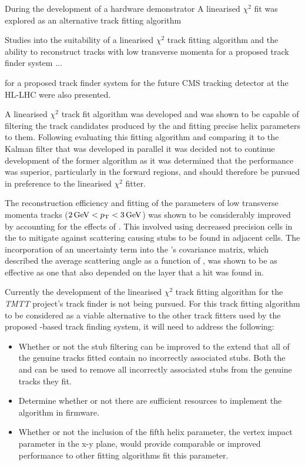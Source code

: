 During the development of a hardware demonstrator 
A linearised $\chi^{2}$ fit was explored as an alternative track fitting algorithm

Studies into the suitability of a linearised $\chi^{2}$ track fitting algorithm and the ability to reconstruct tracks with low transverse momenta for a proposed track finder system ...

 for a proposed track finder system for the future CMS tracking detector at the HL-LHC were also presented.

A linearised $\chi^{2}$ track fit algorithm was developed and was shown to be capable of filtering the track candidates produced by the \HT and fitting precise helix parameters to them.
Following evaluating this fitting algorithm and comparing it to the Kalman filter that was developed in parallel it was decided not to continue development of the former algorithm as it was determined that the \KF performance was superior, particularly in the forward regions, and should therefore be pursued in preference to the linearised $\chi^{2}$ fitter.

The reconstruction efficiency and fitting of the parameters of low transverse momenta tracks ($2\,\text{Ge\hspace{-.08em}V} < p_{\mathrm{T}} < 3\,\text{Ge\hspace{-.08em}V}$) was shown to be considerably improved by accounting for the effects of \MS.
This involved using decreased precision cells in the \HT to mitigate against scattering causing stubs to be found in adjacent \HT cells.
The incorporation of an uncertainty term into the \KF's covariance matrix, which described the average scattering angle as a function of \pT, was shown to be as effective as one that also depended on the layer that a hit was found in.

Currently the development of the linearised $\chi^{2}$ track fitting algorithm for the \emph{TMTT} project's track finder is not being pursued.
For this track fitting algorithm to be considered as a viable alternative to the other track fitters used by the proposed \HT-based track finding system, it will need to address the following:

\begin{itemize}
\item Whether or not the stub filtering can be improved to the extend that all of the genuine tracks fitted contain no incorrectly associated stubs. Both the \KF and \LR can be used to remove all incorrectly associated stubs from the genuine tracks they fit. 
\item Determine whether or not there are sufficient resources to implement the algorithm in firmware.
\item Whether or not the inclusion of the fifth helix parameter, the vertex impact parameter in the x-y plane, would provide comparable or improved performance to other fitting algorithms fit this parameter.
\end{itemize}

